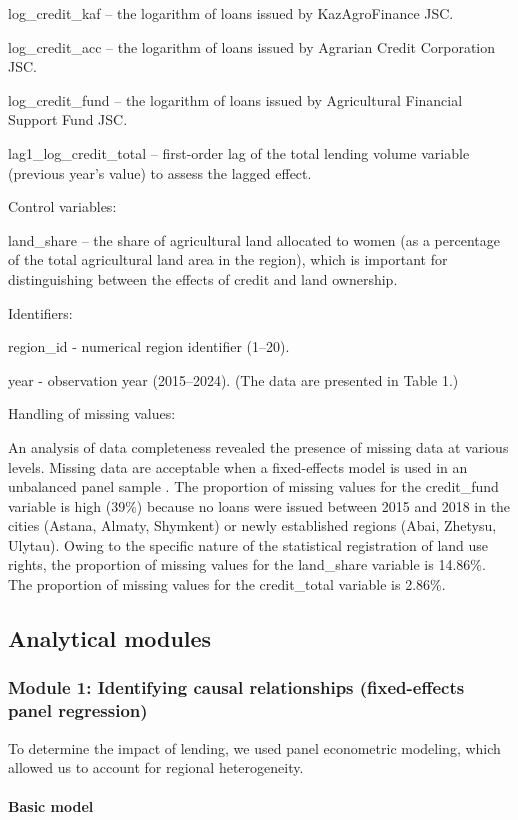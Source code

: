 ﻿\documentclass[pdflatex,sn-mathphys-ay]{sn-jnl}
\begin{document}
log\_credit\_kaf -- the logarithm of loans issued by KazAgroFinance JSC.

log\_credit\_acc -- the logarithm of loans issued by Agrarian Credit
Corporation JSC.

log\_credit\_fund -- the logarithm of loans issued by Agricultural
Financial Support Fund JSC.

lag1\_log\_credit\_total -- first-order lag of the total lending volume
variable (previous year's value) to assess the lagged effect.

Control variables:

land\_share -- the share of agricultural land allocated to women (as a
percentage of the total agricultural land area in the region), which is
important for distinguishing between the effects of credit and land
ownership.

Identifiers:

region\_id - numerical region identifier (1--20).

year - observation year (2015--2024). (The data are presented in Table 1.)

Handling of missing values:

An analysis of data completeness revealed the presence of missing data
at various levels. Missing data are acceptable when a fixed-effects
model is used in an unbalanced panel sample \citep{ref100}. The
proportion of missing values for the credit\_fund variable is high
(39\%) because no loans were issued between 2015 and 2018 in the cities
(Astana, Almaty, Shymkent) or newly established regions (Abai,
Zhetysu, Ulytau). Owing to the specific nature of the statistical
registration of land use rights, the proportion of missing values for
the land\_share variable is 14.86\%. The proportion of missing values
for the credit\_total variable is 2.86\%.

\subsection{Analytical modules}

\subsubsection{Module 1: Identifying causal relationships (fixed-effects panel regression)}

To determine the impact of lending, we used panel econometric modeling,
which allowed us to account for regional heterogeneity.

\paragraph{Basic model}
\end{document}
